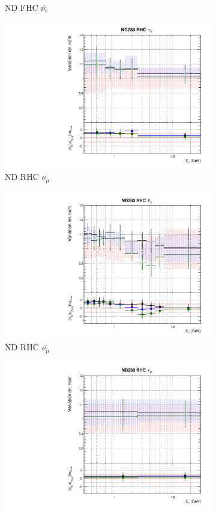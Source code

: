 \begin{figure}
\begin{subfigure}{0.45\textwidth}
  \caption{ND FHC $\bar{\nu_{e}}$}
\end{subfigure}
\begin{subfigure}{0.45\textwidth}
  \centering
  \includegraphics[width=0.75\linewidth]{figs/fhcrhcfitsflux_4}
  \caption{ND RHC $\nu_{\mu}$}
\end{subfigure}
\begin{subfigure}{0.45\textwidth}
  \centering
  \includegraphics[width=0.75\linewidth]{figs/fhcrhcfitsflux_5}
  \caption{ND RHC $\bar{\nu_{\mu}}$}
\end{subfigure}
\begin{subfigure}{0.45\textwidth}
  \centering
  \includegraphics[width=0.75\linewidth]{figs/fhcrhcfitsflux_6}

\end{subfigure}
\end{figure}
